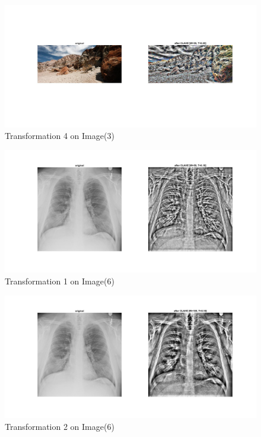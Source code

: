 \documentclass[12pt, a4paper]{article}
\begin{document}
\renewcommand{\thefigure}{5.34}
\begin{figure}[H]
    \centering
    \vspace*{-30pt}
    \includegraphics[width=\textwidth]{e34.jpg}
    \vspace*{-90pt}
    \caption{Transformation 4 on Image(3)}
    \label{fig:5.34}
\end{figure}
\newpage
\renewcommand{\thefigure}{5.61}
\begin{figure}[H]
    \centering
    \includegraphics[width=\textwidth]{e61.jpg}
    \vspace*{-60pt}
    \caption{Transformation 1 on Image(6)}
    \label{fig:5.61}
\end{figure}
\renewcommand{\thefigure}{5.62}
\begin{figure}[H]
    \centering
    \vspace*{-30pt}
    \includegraphics[width=\textwidth]{e62.jpg}
    \vspace*{-60pt}
    \caption{Transformation 2 on Image(6)}
    \label{fig:5.62}
\end{figure}
\end{document}
